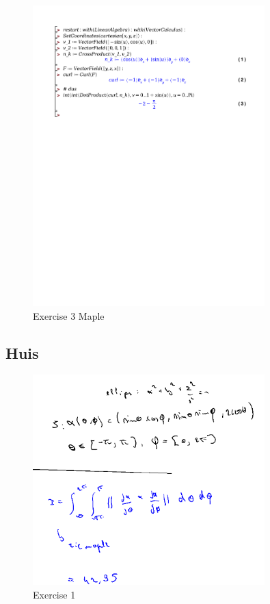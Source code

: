 \documentclass[a4paper]{report}
\begin{document}
\begin{figure}[H]
	\centering
	\includegraphics[width=0.8\textwidth]{exercises/bord_7_ex_3.pdf}
	\caption{Exercise 3 Maple}
	\label{fig:bord_7_ex_3_maple}
\end{figure}

\subsection{Huis}

\begin{figure}[H]
	\centering
	\includegraphics[width=0.8\textwidth]{assets/huis_7_ex_1.png}
	\caption{Exercise 1}
	\label{fig:huis_7_ex_1}
\end{figure}
\end{document}
